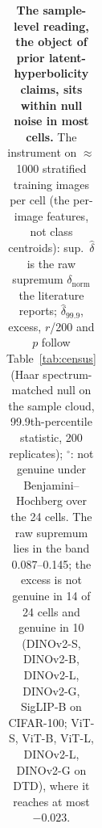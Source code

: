\begin{table}[H]
\begin{tabular}{lccccc|ccccc}
\bottomrule
\end{tabular}
\caption{\textbf{The sample-level reading, the object of prior latent-hyperbolicity claims, sits within null noise in most cells.} The instrument on $\approx$1000 stratified training images per cell (the per-image features, not class centroids): sup.\ $\hat\delta$ is the raw supremum $\delta_{\text{norm}}$ the literature reports; $\hat\delta_{99.9}$, excess, $r$/200 and $p$ follow Table~\ref{tab:census} (Haar spectrum-matched null on the sample cloud, 99.9th-percentile statistic, 200 replicates); $^{\circ}$: not genuine under Benjamini--Hochberg over the 24 cells. The raw supremum lies in the band 0.087--0.145; the excess is not genuine in 14 of 24 cells and genuine in 10 (DINOv2-S, DINOv2-B, DINOv2-L, DINOv2-G, SigLIP-B on CIFAR-100; ViT-S, ViT-B, ViT-L, DINOv2-L, DINOv2-G on DTD), where it reaches at most $-0.023$. %
}
\label{tab:b17-samplelevel}
\end{table}
